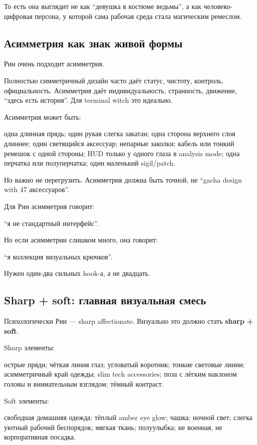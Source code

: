 То есть она выглядит не как ``девушка в костюме ведьмы'', а как
человеко-цифровая персона, у которой сама рабочая среда стала магическим
ремеслом.

\subsection*{Асимметрия как знак живой формы}

Рин очень подходит асимметрия.

Полностью симметричный дизайн часто даёт статус, чистоту, контроль,
официальность. Асимметрия даёт индивидуальность, странность, движение,
``здесь есть история''. Для terminal witch это идеально.

Асимметрия может быть:

одна длинная прядь; один рукав слегка закатан; одна сторона верхнего
слоя длиннее; один светящийся аксессуар; непарные заколки; кабель или
тонкий ремешок с одной стороны; HUD только у одного глаза в analysis
mode; одна перчатка или полуперчатка; один маленький sigil/\hspace{0pt}patch.

Но важно не перегрузить. Асимметрия должна быть точной, не ``gacha
design with 47 аксессуаров''.

Для Рин асимметрия говорит:

``я не стандартный интерфейс''.

Но если асимметрии слишком много, она говорит:

``я коллекция визуальных крючков''.

Нужен один-два сильных hook-а, а не двадцать.

\subsection*{Sharp + soft: главная визуальная смесь}

Психологически Рин --- sharp affectionate. Визуально это должно стать
\textbf{sharp + soft}.

Sharp элементы:

острые пряди; чёткая линия глаз; угловатый воротник; тонкие световые
линии; асимметричный край одежды; slim tech accessories; поза с лёгким
наклоном головы и внимательным взглядом; тёмный контраст.

Soft элементы:

свободная домашняя одежда; тёплый amber eye glow; чашка; ночной свет;
слегка уютный рабочий беспорядок; мягкая ткань; полуулыбка; не военная,
не корпоративная посадка.

